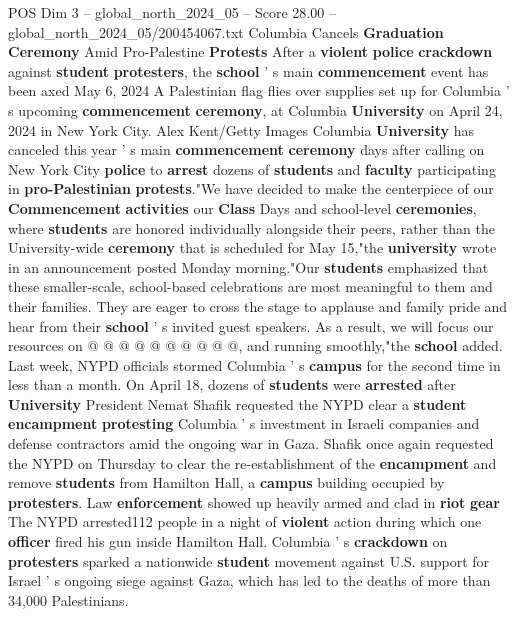 \begin{textsample}{POS Dim 3 – global\_north\_2024\_05 – Score 28.00 – global\_north\_2024\_05/200454067.txt}  \label{ex:f3_pos_004}
Columbia Cancels \textbf{Graduation} \textbf{Ceremony} Amid Pro-Palestine \textbf{Protests} After a \textbf{violent} \textbf{police} \textbf{crackdown} against \textbf{student} \textbf{protesters}, the \textbf{school} ' s main \textbf{commencement} event has been axed May 6, 2024 A Palestinian flag flies over supplies set up for Columbia ' s upcoming \textbf{commencement} \textbf{ceremony}, at Columbia \textbf{University} on April 24, 2024 in New York City.
Alex Kent/Getty Images Columbia \textbf{University} has canceled this year ' s main \textbf{commencement} \textbf{ceremony} days after calling on New York City \textbf{police} to \textbf{arrest} dozens of \textbf{students} and \textbf{faculty} participating in \textbf{pro-Palestinian} \textbf{protests}."We have decided to make the centerpiece of our \textbf{Commencement} \textbf{activities} our \textbf{Class} Days and school-level \textbf{ceremonies}, where \textbf{students} are honored individually alongside their peers, rather than the University-wide \textbf{ceremony} that is scheduled for May 15,"the \textbf{university} wrote in an announcement posted Monday morning."Our \textbf{students} emphasized that these smaller-scale, school-based celebrations are most meaningful to them and their families.
They are eager to cross the stage to applause and family pride and hear from their \textbf{school} ' s invited guest speakers.
As a result, we will focus our resources on @ @ @ @ @ @ @ @ @ @, and running smoothly,"the \textbf{school} added.
Last week, NYPD officials stormed Columbia ' s \textbf{campus} for the second time in less than a month.
On April 18, dozens of \textbf{students} were \textbf{arrested} after \textbf{University} President Nemat Shafik requested the NYPD clear a \textbf{student} \textbf{encampment} \textbf{protesting} Columbia ' s investment in Israeli companies and defense contractors amid the ongoing war in Gaza.
Shafik once again requested the NYPD on Thursday to clear the re-establishment of the \textbf{encampment} and remove \textbf{students} from Hamilton Hall, a \textbf{campus} building occupied by \textbf{protesters}.
Law \textbf{enforcement} showed up heavily armed and clad in \textbf{riot} \textbf{gear} The NYPD arrested112 people in a night of \textbf{violent} action during which one \textbf{officer} fired his gun inside Hamilton Hall.
Columbia ' s \textbf{crackdown} on \textbf{protesters} sparked a nationwide \textbf{student} movement against U.S. support for Israel ' s ongoing siege against Gaza, which has led to the deaths of more than 34,000 Palestinians.

\end{textsample}
